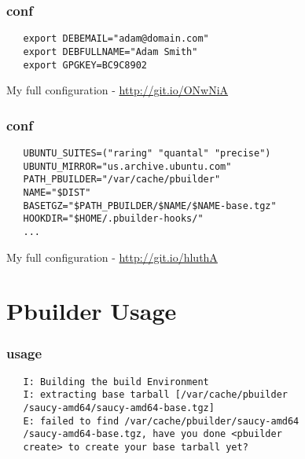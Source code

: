 \documentclass[dvipsnames]{beamer}
\begin{document}
\begin{frame}[fragile]
  \frametitle{conf}
  \begin{center}
  \end{center}
\begin{verbatim}
   export DEBEMAIL="adam@domain.com"
   export DEBFULLNAME="Adam Smith"
   export GPGKEY=BC9C8902
\end{verbatim}
  \begin{center}
      {My full configuration -}
      \url{http://git.io/ONwNiA}
  \end{center}
\end{frame}

\begin{frame}[fragile]
  \frametitle{conf}
  \begin{center}
  \end{center}
  \begin{verbatim}
   UBUNTU_SUITES=("raring" "quantal" "precise")
   UBUNTU_MIRROR="us.archive.ubuntu.com"
   PATH_PBUILDER="/var/cache/pbuilder"
   NAME="$DIST"
   BASETGZ="$PATH_PBUILDER/$NAME/$NAME-base.tgz"
   HOOKDIR="$HOME/.pbuilder-hooks/"
   ...
  \end{verbatim}
  \begin{center}
      {My full configuration -}
      \url{http://git.io/hluthA}
  \end{center}
\end{frame}

\section[Usage]{Pbuilder Usage}

\begin{frame}[fragile]
  \frametitle{usage}
  \begin{center}
  \end{center}
  \begin{verbatim}
   I: Building the build Environment
   I: extracting base tarball [/var/cache/pbuilder
   /saucy-amd64/saucy-amd64-base.tgz]
   E: failed to find /var/cache/pbuilder/saucy-amd64
   /saucy-amd64-base.tgz, have you done <pbuilder 
   create> to create your base tarball yet?
  \end{verbatim}
  
  \begin{center}
  \end{center}
\end{frame}
\end{document}
